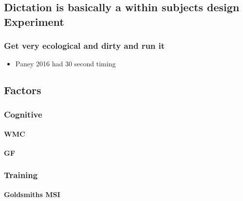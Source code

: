 \documentclass[]{book}
\providecommand{\tightlist}{%
  \setlength{\itemsep}{0pt}\setlength{\parskip}{0pt}}
\let\oldparagraph\paragraph
\renewcommand{\paragraph}[1]{\oldparagraph{#1}\mbox{}}
\theoremstyle{definition}
\theoremstyle{definition}
\theoremstyle{definition}
\theoremstyle{remark}
\begin{document}
\hypertarget{dictation-is-basically-a-within-subjects-design-experiment}{%
\subsection{Dictation is basically a within subjects design
Experiment}\label{dictation-is-basically-a-within-subjects-design-experiment}}

\hypertarget{get-very-ecological-and-dirty-and-run-it}{%
\subsubsection{Get very ecological and dirty and run
it}\label{get-very-ecological-and-dirty-and-run-it}}

\begin{itemize}
\tightlist
\item
  Paney 2016 had 30 second timing
\end{itemize}

\hypertarget{factors}{%
\subsection{Factors}\label{factors}}

\hypertarget{cognitive-1}{%
\subsubsection{Cognitive}\label{cognitive-1}}

\hypertarget{wmc}{%
\paragraph{WMC}\label{wmc}}

\hypertarget{gf}{%
\paragraph{GF}\label{gf}}

\hypertarget{training}{%
\subsubsection{Training}\label{training}}

\hypertarget{goldsmiths-msi}{%
\paragraph{Goldsmiths MSI}\label{goldsmiths-msi}}
\end{document}
